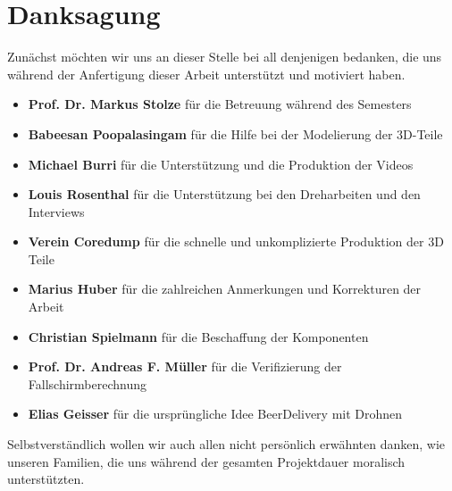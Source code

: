\newpage
{}
\chapter*{Danksagung}
Zunächst möchten wir uns an dieser Stelle bei all denjenigen bedanken, die uns während der Anfertigung dieser Arbeit unterstützt und motiviert haben.
\begin{itemize}
	\item{\textbf{Prof. Dr. Markus Stolze} für die Betreuung während des Semesters}
	\item{\textbf{Babeesan Poopalasingam} für die Hilfe bei der Modelierung der 3D-Teile}
	\item{\textbf{Michael Burri} für die Unterstützung und die Produktion der Videos}
	\item{\textbf{Louis Rosenthal} für die Unterstützung bei den Dreharbeiten und den Interviews}
	\item{\textbf{Verein Coredump} für die schnelle und unkomplizierte Produktion der 3D Teile}
	\item{\textbf{Marius Huber} für die zahlreichen Anmerkungen und Korrekturen  der Arbeit}
    \item{\textbf{Christian Spielmann} für die Beschaffung der Komponenten}
	\item{\textbf{Prof. Dr. Andreas F. Müller} für die Verifizierung der Fallschirmberechnung}
	\item{\textbf{Elias Geisser} für die ursprüngliche Idee BeerDelivery mit Drohnen}
\end{itemize}
Selbstverständlich wollen wir auch allen nicht persönlich erwähnten danken, wie unseren Familien, die uns während der gesamten Projektdauer moralisch unterstützten.